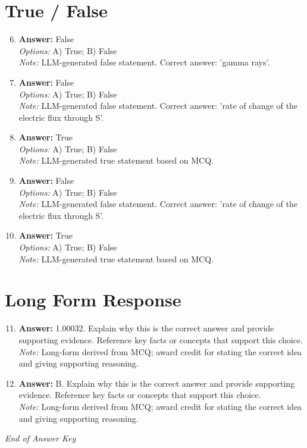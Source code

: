 \documentclass[12pt]{article}
\begin{document}
\section*{True / False}
\begin{enumerate}[label=\arabic*.]
\setcounter{enumi}{5}
\item \textbf{Answer:} False
\\ \textit{Options:} A) True; B) False
\\ \textit{Note:} LLM-generated false statement. Correct answer: 'gamma rays'.
\item \textbf{Answer:} False
\\ \textit{Options:} A) True; B) False
\\ \textit{Note:} LLM-generated false statement. Correct answer: 'rate of change of the electric flux through S'.
\item \textbf{Answer:} True
\\ \textit{Options:} A) True; B) False
\\ \textit{Note:} LLM-generated true statement based on MCQ.
\item \textbf{Answer:} False
\\ \textit{Options:} A) True; B) False
\\ \textit{Note:} LLM-generated false statement. Correct answer: 'rate of change of the electric flux through S'.
\item \textbf{Answer:} True
\\ \textit{Options:} A) True; B) False
\\ \textit{Note:} LLM-generated true statement based on MCQ.
\end{enumerate}

\section*{Long Form Response}
\begin{enumerate}[label=\arabic*.]
\setcounter{enumi}{10}
\item \textbf{Answer:} 1.00032. Explain why this is the correct answer and provide supporting evidence. Reference key facts or concepts that support this choice.
\\ \textit{Note:} Long-form derived from MCQ; award credit for stating the correct idea and giving supporting reasoning.
\item \textbf{Answer:} B. Explain why this is the correct answer and provide supporting evidence. Reference key facts or concepts that support this choice.
\\ \textit{Note:} Long-form derived from MCQ; award credit for stating the correct idea and giving supporting reasoning.
\end{enumerate}

\vfill
\noindent\textit{End of Answer Key}
\end{document}
